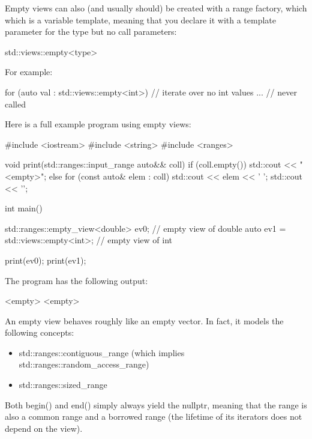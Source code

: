 
Empty views can also (and usually should) be created with a range factory, which which is a variable template, meaning that you declare it with a template parameter for the type but no call parameters:

\begin{cpp}
std::views::empty<type>
\end{cpp}

For example:

\begin{cpp}
for (auto val : std::views::empty<int>) { // iterate over no int values
	... // never called
}
\end{cpp}

Here is a full example program using empty views:


\begin{cpp}
#include <iostream>
#include <string>
#include <ranges>

void print(std::ranges::input_range auto&& coll)
{
	if (coll.empty()) {
		std::cout << "<empty>\n";
	}
	else {
		for (const auto& elem : coll) {
			std::cout << elem << ' ';
		}
		std::cout << '\n';
	}
}

int main()
{
	std::ranges::empty_view<double> ev0; // empty view of double
	auto ev1 = std::views::empty<int>; // empty view of int
	
	print(ev0);
	print(ev1);
}
\end{cpp}

The program has the following output:

\begin{shell}
<empty>
<empty>
\end{shell}


An empty view behaves roughly like an empty vector. In fact, it models the following concepts:

\begin{itemize}
\item
std::ranges::contiguous\_range (which implies std::ranges::random\_access\_range)

\item
std::ranges::sized\_range
\end{itemize}

Both begin() and end() simply always yield the nullptr, meaning that the range is also a common range and a borrowed range (the lifetime of its iterators does not depend on the view).

